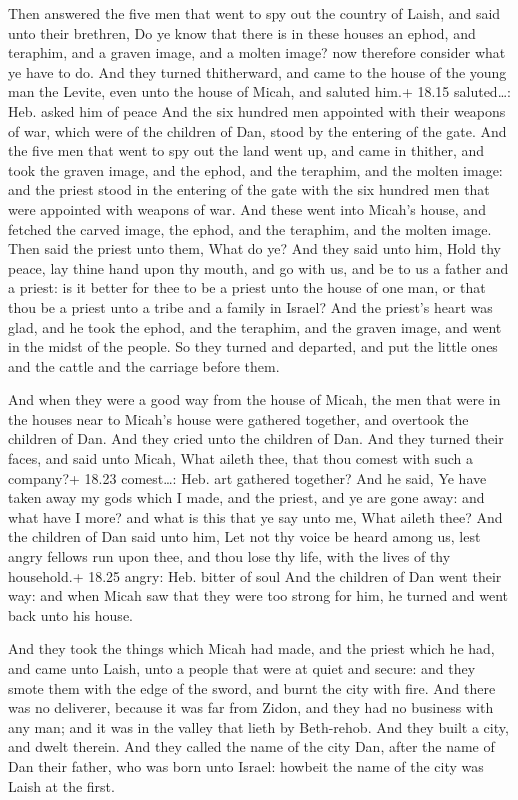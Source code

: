  Then answered the five men that went to spy out the
country of Laish, and said unto their brethren, Do ye know that there is
in these houses an ephod, and teraphim, and a graven image, and a molten
image? now therefore consider what ye have to do.  And they
turned thitherward, and came to the house of the young man the Levite,
even unto the house of Micah, and saluted him.+ 18.15 saluted\ldots:
Heb. asked him of peace  And the six hundred men appointed
with their weapons of war, which were of the children of Dan, stood by
the entering of the gate.  And the five men that went to
spy out the land went up, and came in thither, and took the graven
image, and the ephod, and the teraphim, and the molten image: and the
priest stood in the entering of the gate with the six hundred men that
were appointed with weapons of war.  And these went into
Micah's house, and fetched the carved image, the ephod, and the
teraphim, and the molten image. Then said the priest unto them, What do
ye?  And they said unto him, Hold thy peace, lay thine hand
upon thy mouth, and go with us, and be to us a father and a priest: is
it better for thee to be a priest unto the house of one man, or that
thou be a priest unto a tribe and a family in Israel?  And
the priest's heart was glad, and he took the ephod, and the teraphim,
and the graven image, and went in the midst of the people. 
So they turned and departed, and put the little ones and the cattle and
the carriage before them.

 And when they were a good way from the house of Micah,
the men that were in the houses near to Micah's house were gathered
together, and overtook the children of Dan.  And they cried
unto the children of Dan. And they turned their faces, and said unto
Micah, What aileth thee, that thou comest with such a company?+ 18.23
comest\ldots: Heb. art gathered together?  And he said, Ye
have taken away my gods which I made, and the priest, and ye are gone
away: and what have I more? and what is this that ye say unto me, What
aileth thee?  And the children of Dan said unto him, Let
not thy voice be heard among us, lest angry fellows run upon thee, and
thou lose thy life, with the lives of thy household.+ 18.25 angry: Heb.
bitter of soul  And the children of Dan went their way: and
when Micah saw that they were too strong for him, he turned and went
back unto his house.

 And they took the things which Micah had made, and the
priest which he had, and came unto Laish, unto a people that were at
quiet and secure: and they smote them with the edge of the sword, and
burnt the city with fire.  And there was no deliverer,
because it was far from Zidon, and they had no business with any man;
and it was in the valley that lieth by Beth-rehob. And they built a
city, and dwelt therein.  And they called the name of the
city Dan, after the name of Dan their father, who was born unto Israel:
howbeit the name of the city was Laish at the first.

